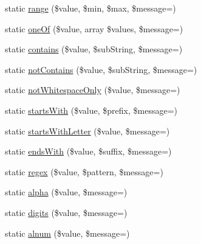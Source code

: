 \begin{DoxyCompactItemize}
\item 
static \mbox{\hyperlink{class_webmozart_1_1_assert_1_1_assert_adbaa1be5005cc4c0a6166a7dba472f02}{range}} (\$value, \$min, \$max, \$message=\textquotesingle{}\textquotesingle{})
\item 
static \mbox{\hyperlink{class_webmozart_1_1_assert_1_1_assert_ade66bf8d00bfe5714061272d0550a698}{one\+Of}} (\$value, array \$values, \$message=\textquotesingle{}\textquotesingle{})
\item 
static \mbox{\hyperlink{class_webmozart_1_1_assert_1_1_assert_a22b867fa690d62a2cf191c15e1c38d34}{contains}} (\$value, \$sub\+String, \$message=\textquotesingle{}\textquotesingle{})
\item 
static \mbox{\hyperlink{class_webmozart_1_1_assert_1_1_assert_a451d2433e5ff1229689bf66666f1241a}{not\+Contains}} (\$value, \$sub\+String, \$message=\textquotesingle{}\textquotesingle{})
\item 
static \mbox{\hyperlink{class_webmozart_1_1_assert_1_1_assert_af7c2c171896c8531e26b085e1fe43877}{not\+Whitespace\+Only}} (\$value, \$message=\textquotesingle{}\textquotesingle{})
\item 
static \mbox{\hyperlink{class_webmozart_1_1_assert_1_1_assert_ab1a1c8e5194020da9f37698c7f42924e}{starts\+With}} (\$value, \$prefix, \$message=\textquotesingle{}\textquotesingle{})
\item 
static \mbox{\hyperlink{class_webmozart_1_1_assert_1_1_assert_ab74ad04e83649bdac2ca7fecf41a4e3e}{starts\+With\+Letter}} (\$value, \$message=\textquotesingle{}\textquotesingle{})
\item 
static \mbox{\hyperlink{class_webmozart_1_1_assert_1_1_assert_a8ab8ebcace6812fa76437287aa375a91}{ends\+With}} (\$value, \$suffix, \$message=\textquotesingle{}\textquotesingle{})
\item 
static \mbox{\hyperlink{class_webmozart_1_1_assert_1_1_assert_a5d0a0de01bec8ae90e551e5081317303}{regex}} (\$value, \$pattern, \$message=\textquotesingle{}\textquotesingle{})
\item 
static \mbox{\hyperlink{class_webmozart_1_1_assert_1_1_assert_a541fb5b37ab816c9960d1d59aa72017c}{alpha}} (\$value, \$message=\textquotesingle{}\textquotesingle{})
\item 
static \mbox{\hyperlink{class_webmozart_1_1_assert_1_1_assert_ac72ea848078236a8f4ad4e75f1feec13}{digits}} (\$value, \$message=\textquotesingle{}\textquotesingle{})
\item 
static \mbox{\hyperlink{class_webmozart_1_1_assert_1_1_assert_a52f0b05834e512d4f0b94560650733b8}{alnum}} (\$value, \$message=\textquotesingle{}\textquotesingle{})

\end{DoxyCompactItemize}
